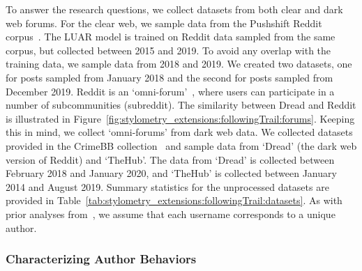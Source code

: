 To answer the research questions, we collect datasets from both clear and dark web forums.
For the clear web, we sample data from the Pushshift Reddit corpus~\citep{baumgartner2020pushshift}.
The LUAR model is trained on Reddit data sampled from the same corpus, but collected between 2015 and 2019.
To avoid any overlap with the training data, we sample data from 2018 and 2019.
We created two datasets, one for posts sampled from January 2018 and the second for posts sampled from December 2019.
Reddit is an `omni-forum'~\citep{munksgaard2016mixing}, where users can participate in a number of subcommunities (subreddit).
The similarity between Dread and Reddit is illustrated in Figure~\ref{fig:stylometry_extensions:followingTrail:forums}.
Keeping this in mind, we collect `omni-forums' from dark web data.
We collected datasets provided in the CrimeBB collection~\citep{pastrana2018crimebb} and sample data from `Dread' (the dark web version of Reddit) and `TheHub'.
The data from `Dread' is collected between February 2018 and January 2020, and `TheHub' is collected between January 2014 and August 2019.
Summary statistics for the unprocessed datasets are provided in Table~\ref{tab:stylometry_extensions:followingTrail:datasets}. 
As with prior analyses from~, we assume that each username corresponds to a unique author.

\subsubsection{Characterizing Author Behaviors}
\label{chp:stylometry_extensions:followingTrail:datasets:behaviors}


